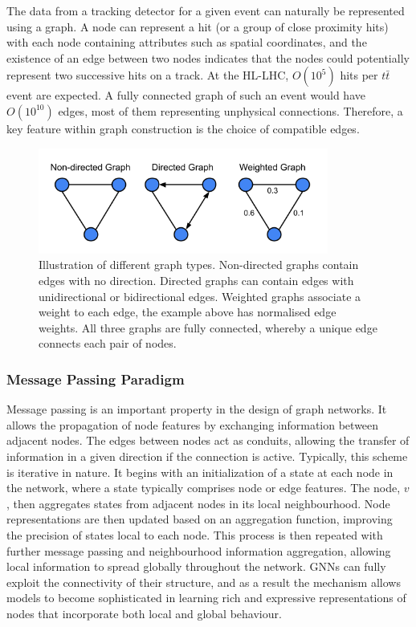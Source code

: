 The data from a tracking detector for a given event can naturally be represented using a graph. A node can represent a hit (or a group of close proximity hits) with each node containing attributes such as spatial coordinates, and the existence of an edge between two nodes indicates that the nodes could potentially represent two successive hits on a track. At the HL-LHC, $O(10^{5})$ hits per $t\bar{t}$ event are expected. A fully connected graph of such an event would have $O(10^{10})$ edges, most of them representing unphysical connections. Therefore, a key feature within graph construction is the choice of compatible edges. 

\begin{figure}[!htbp]
  \centering
  \includegraphics[width=0.85\textwidth]{images/3-track-reconstruction/Graphs.png}
  \caption{
    Illustration of different graph types. Non-directed graphs contain edges with no direction. Directed graphs can contain edges with unidirectional or bidirectional edges. Weighted graphs associate a weight to each edge, the example above has normalised edge weights. All three graphs are fully connected, whereby a unique edge connects each pair of nodes.
  }
  \label{fig:graph-architecture-example}
\end{figure}


\subsubsection{Message Passing Paradigm}

Message passing is an important property in the design of graph networks. It allows the propagation of node features by exchanging information between adjacent nodes. The edges between nodes act as conduits, allowing the transfer of information in a given direction if the connection is active. Typically, this scheme is iterative in nature. It begins with an initialization of a state at each node in the network, where a state typically comprises node or edge features. The node, $v$, then aggregates states from adjacent nodes in its local neighbourhood. Node representations are then updated based on an aggregation function, improving the precision of states local to each node. This process is then repeated with further message passing and neighbourhood information aggregation, allowing local information to spread globally throughout the network. GNNs can fully exploit the connectivity of their structure, and as a result the mechanism allows models to become sophisticated in learning rich and expressive representations of nodes that incorporate both local and global behaviour.


